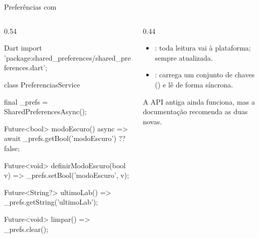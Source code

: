 \documentclass[aspectratio=169,10pt]{beamer}
\begin{document}
\begin{frame}[fragile]{Preferências com }
  \begin{columns}[T]
    \begin{column}{0.54\textwidth}
\begin{codigo}[title=data/services/preferencias\_service.dart]{Dart}
import 'package:shared_preferences/shared_preferences.dart';

class PreferenciasService {
  final _prefs = SharedPreferencesAsync();

  Future<bool> modoEscuro() async =>
      await _prefs.getBool('modoEscuro') ?? false;

  Future<void> definirModoEscuro(bool v) =>
      _prefs.setBool('modoEscuro', v);

  Future<String?> ultimoLab() => _prefs.getString('ultimoLab');

  Future<void> limpar() => _prefs.clear();
}
\end{codigo}
    \end{column}
    \begin{column}{0.44\textwidth}
      \begin{conceito}
        \begin{itemize}
          \item {}: toda leitura vai à plataforma; sempre atualizada.
          \item {}: carrega um conjunto de chaves () e lê de forma síncrona.
        \end{itemize}
      \end{conceito}
      \begin{dica}
        A API antiga  ainda funciona, mas a documentação recomenda as duas novas.
      \end{dica}
    \end{column}
  \end{columns}
\end{frame}
\end{document}
